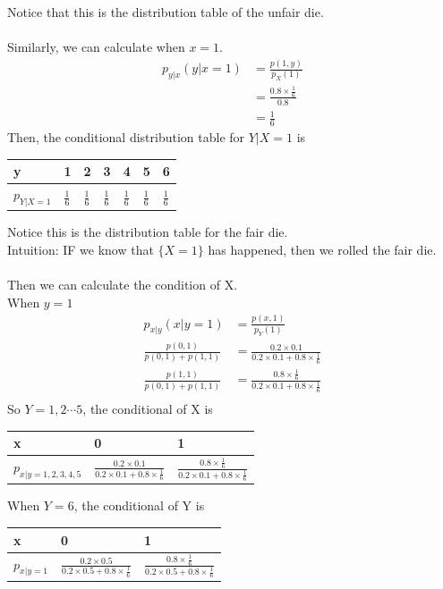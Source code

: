 \documentclass[11pt,oneside]{book}
\theoremstyle{break}
\theoremstyle{break}
\begin{document}
Notice that this is the distribution table of the unfair die.\\
\hfill\\
Similarly, we can calculate when $x=1$.\begin{align*}
p_{y|x}(y|x=1)&=\frac{p(1,y)}{p_X(1)}\\
&=\frac{0.8\times \frac{1}{6}}{0.8}\\
&=\frac{1}{6}
\end{align*}
Then, the conditional distribution table for $Y|X=1$ is\begin{center}
\begin{tabular}{|l|l|l|l|l|l|l|}
\hline
y        & 1   & 2   & 3   & 4   & 5   & 6   \\ \hline
$p_{Y|X=1}$ & $\frac{1}{6}$ & $\frac{1}{6}$ & $\frac{1}{6}$ & $\frac{1}{6}$ & $\frac{1}{6}$ & $\frac{1}{6}$\\ \hline
\end{tabular}
\end{center}
Notice this is the distribution table for the fair die. \\
Intuition: IF we know that $\{X=1\}$ has happened, then we rolled the fair die.\\
\hfill\\
Then we can calculate the condition of X.\\
When $y=1$\begin{align*}
p_{x|y}(x|y=1)&=\frac{p(x,1)}{p_Y(1)}\\
\frac{p(0,1)}{p(0,1)+p(1,1)}&=\frac{0.2\times 0.1}{0.2\times 0.1 +0.8\times \frac{1}{6}}\\
\frac{p(1,1)}{p(0,1)+p(1,1)}&=\frac{0.8\times \frac{1}{6}}{0.2\times 0.1 +0.8\times \frac{1}{6}}\\
\end{align*}
So $Y=1,2\cdots 5$, the conditional of X is
\begin{center}
\begin{tabular}{|l|l|l|}
\hline
x           & 0 & 1 \\ \hline
$p_{x|y=1,2,3,4,5}$ & $\frac{0.2\times 0.1}{0.2\times 0.1 +0.8\times \frac{1}{6}}$  &  $\frac{0.8\times \frac{1}{6}}{0.2\times 0.1 +0.8\times \frac{1}{6}}$ \\ \hline
\end{tabular}
\end{center}
When $Y=6$, the conditional of Y is \begin{center}
\begin{tabular}{|l|l|l|}
\hline
x           & 0 & 1 \\ \hline
$p_{x|y=1}$ & $\frac{0.2\times 0.5}{0.2\times 0.5 +0.8\times \frac{1}{6}}$  &  $\frac{0.8\times \frac{1}{6}}{0.2\times 0.5+0.8\times \frac{1}{6}}$ \\ \hline
\end{tabular}
\end{center}
\end{document}
